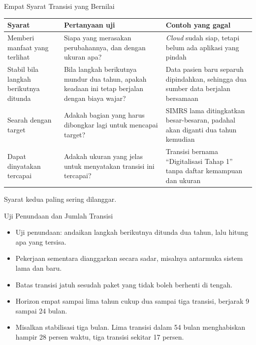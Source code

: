 \documentclass[aspectratio=169, table, 12pt]{beamer}
\begin{document}
\begin{frame}{{\Large Empat Syarat Transisi yang Bernilai}}
  \scriptsize
  \begin{tabularx}{\textwidth}{L{2.6cm}YY}
    \hline
    \textbf{Syarat} & \textbf{Pertanyaan uji} & \textbf{Contoh yang gagal} \\
    \hline
    Memberi manfaat yang terlihat & Siapa yang merasakan perubahannya, dan
      dengan ukuran apa? & \textit{Cloud} sudah siap, tetapi belum ada
      aplikasi yang pindah \\
    \hline
    Stabil bila langkah berikutnya ditunda & Bila langkah berikutnya mundur
      dua tahun, apakah keadaan ini tetap berjalan dengan biaya wajar? & Data
      pasien baru separuh dipindahkan, sehingga dua sumber data berjalan
      bersamaan \\
    \hline
    Searah dengan target & Adakah bagian yang harus dibongkar lagi untuk
      mencapai target? & SIMRS lama ditingkatkan besar-besaran, padahal akan
      diganti dua tahun kemudian \\
    \hline
    Dapat dinyatakan tercapai & Adakah ukuran yang jelas untuk menyatakan
      transisi ini tercapai? & Transisi bernama ``Digitalisasi Tahap 1''
      tanpa daftar kemampuan dan ukuran \\
    \hline
  \end{tabularx}

  \vspace{6pt}
  \small Syarat kedua paling sering dilanggar.
\end{frame}

\begin{frame}{{\Large Uji Penundaan dan Jumlah Transisi}}
  \small
  \vspace{4pt}
  \begin{itemize}
    \item Uji penundaan: andaikan langkah berikutnya ditunda dua tahun, lalu hitung apa yang tersisa.
    \item Pekerjaan sementara dianggarkan secara sadar, misalnya antarmuka sistem lama dan baru.
    \item Batas transisi jatuh sesudah paket yang tidak boleh berhenti di tengah.
    \item Horizon empat sampai lima tahun cukup dua sampai tiga transisi, berjarak 9 sampai 24 bulan.
    \item Misalkan stabilisasi tiga bulan. Lima transisi dalam 54 bulan menghabiskan hampir 28 persen
          waktu, tiga transisi sekitar 17 persen.
  \end{itemize}
\end{frame}
\end{document}
